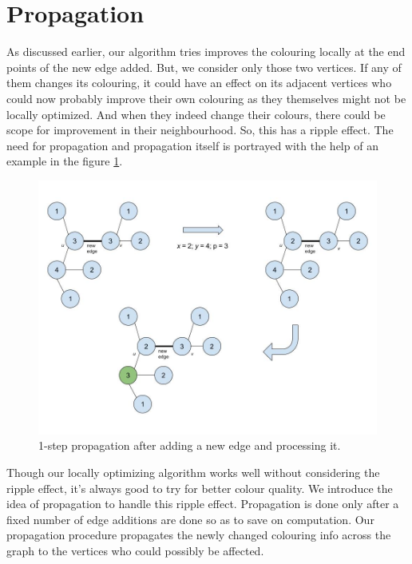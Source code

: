 \documentclass[MTech]{iitmdiss}
\begin{document}
\section{Propagation}
As discussed earlier, our algorithm tries improves the colouring locally at the end points of the new edge added. But, we consider only those two vertices. If any of them changes its colouring, it could have an effect on its adjacent vertices who could now probably improve their own colouring as they themselves might not be locally optimized. And when they indeed change their colours, there could be scope for improvement in their neighbourhood. So, this has a ripple effect. The need for propagation and propagation itself is portrayed with the help of an example in the figure \ref{fig:propagation}.

\begin{figure}[h]
    \centering
    \includegraphics[width=\textwidth,keepaspectratio=true]{propagation.jpg}
    \caption{
        1-step propagation after adding a new edge and processing it. 
    }
    \label{fig:propagation}
\end{figure}

Though our locally optimizing algorithm works well without considering the ripple effect, it's always good to try for better colour quality. We introduce the idea of propagation to handle this ripple effect. Propagation is done only after a fixed number of edge additions are done so as to save on computation. Our propagation procedure propagates the newly changed colouring info across the graph to the vertices who could possibly be affected. 
\end{document}
